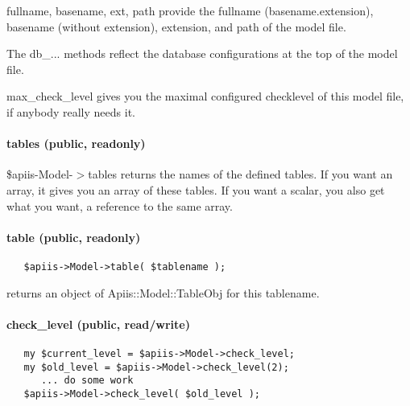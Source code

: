fullname, basename, ext, path provide the fullname (basename.extension),
basename (without extension), extension, and path of the model file.



The db\_... methods reflect the database configurations at the top of the
model file.



max\_check\_level gives you the maximal configured checklevel of this model
file, if anybody really needs it.

\paragraph*{tables (public, readonly)\label{Apiis::Model_--_methods_to_access_the_model_file_data_via_the_apiis_structure_tables_public_readonly_}}


\$apiis-Model-$>$tables returns the names of the defined tables. If you want
an array, it gives you an array of these tables. If you want a scalar, you
also get what you want, a reference to the same array.

\paragraph*{table (public, readonly)\label{Apiis::Model_--_methods_to_access_the_model_file_data_via_the_apiis_structure_table_public_readonly_}}
\begin{verbatim}
   $apiis->Model->table( $tablename );
\end{verbatim}


returns an object of Apiis::Model::TableObj for this tablename.

\paragraph*{check\_level (public, read/write)\label{Apiis::Model_--_methods_to_access_the_model_file_data_via_the_apiis_structure_check_level_public_read_write_}}
\begin{verbatim}
   my $current_level = $apiis->Model->check_level;
   my $old_level = $apiis->Model->check_level(2);
      ... do some work
   $apiis->Model->check_level( $old_level );
\end{verbatim}



